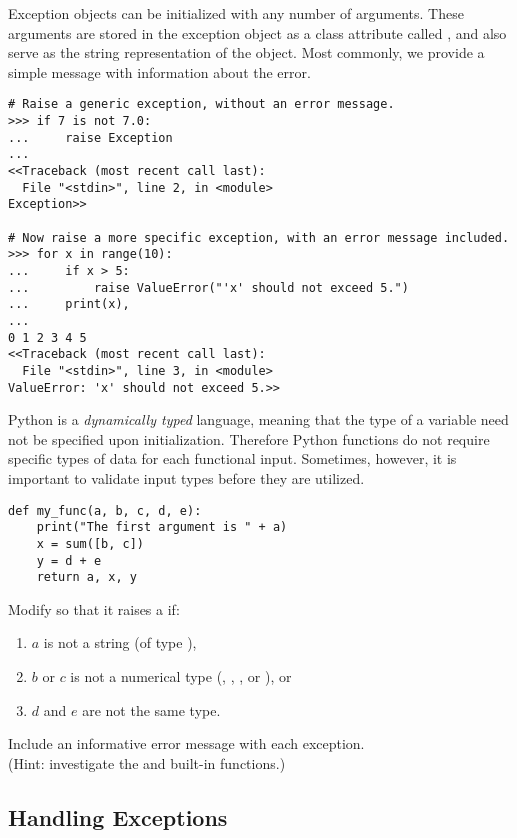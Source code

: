 Exception objects can be initialized with any number of arguments.
These arguments are stored in the exception object as a class attribute called , and also serve as the string representation of the object.
Most commonly, we provide a simple message with information about the error.

\begin{lstlisting}
# Raise a generic exception, without an error message.
>>> if 7 is not 7.0:
...     raise Exception
... 
<<Traceback (most recent call last):
  File "<stdin>", line 2, in <module>
Exception>>

# Now raise a more specific exception, with an error message included.
>>> for x in range(10):
...     if x > 5:
...         raise ValueError("'x' should not exceed 5.")
...     print(x),
... 
0 1 2 3 4 5
<<Traceback (most recent call last):
  File "<stdin>", line 3, in <module>
ValueError: 'x' should not exceed 5.>>
\end{lstlisting}

\begin{problem}
Python is a \emph{dynamically typed} language, meaning that the type of a variable need not be specified upon initialization.
Therefore Python functions do not require specific types of data for each functional input.
Sometimes, however, it is important to validate input types before they are utilized.
\begin{lstlisting}
def my_func(a, b, c, d, e):
    print("The first argument is " + a)
    x = sum([b, c])
    y = d + e
    return a, x, y
\end{lstlisting}
Modify  so that it raises a  if:
\begin{enumerate}
\item $a$ is not a string (of type ),
\item $b$ or $c$ is not a numerical type (, , , or ), or
\item $d$ and $e$ are not the same type.
\end{enumerate}
Include an informative error message with each exception.
\\
(Hint: investigate the  and  built-in functions.)
\end{problem}

\subsection*{Handling Exceptions}

